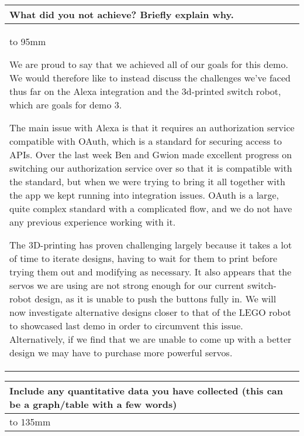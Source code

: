 \documentclass[a4paper]{article}
\newcommand{\colWidth}{141mm}
\begin{document}
\begin{center}

\begin{tabular}{|p{\colWidth}|}
	\hline
	\cellcolor{blue!25}\large
	\textbf{What did you not achieve? Briefly explain why.}
	\\ \hline
	\vtop to 95mm{
		We are proud to say that we achieved all of our goals for this demo.
		We would therefore like to instead discuss the challenges we've faced thus far on the Alexa integration and the 3d-printed switch robot, which are goals for demo 3.

		\vspace{2mm}

		The main issue with Alexa is that it requires an authorization service compatible with OAuth, which is a standard for securing access to APIs.
		Over the last week Ben and Gwion made excellent progress on switching our authorization service over so that it is compatible with the standard,
		but when we were trying to bring it all together with the app we kept running into integration issues. OAuth is a large, quite complex standard
		with a complicated flow, and we do not have any previous experience working with it.

		\vspace{2mm}

		The 3D-printing has proven challenging largely because it takes a lot of time to iterate designs, having to wait for them to print before trying them out and modifying as necessary.
		It also appears that the servos we are using are not strong enough for our current switch-robot design, as it is unable to push the buttons fully in.
		We will now investigate alternative designs closer to that of the LEGO robot to showcased last demo in order to circumvent this issue.
		Alternatively, if we find that we are unable to come up with a better design we may have to purchase more powerful servos.
  }
  \\
  \hline
\end{tabular}
\vskip 5mm


\begin{tabular}{|p{\colWidth}|}
	\hline
	\cellcolor{blue!25}\large
	\textbf{Include any quantitative data you have collected (this can be a graph/table with a few words)}
	\\ \hline
	\vtop to 135mm{
  }
  \\
  \hline
\end{tabular}
\vskip 5mm


\end{center}
\end{document}
